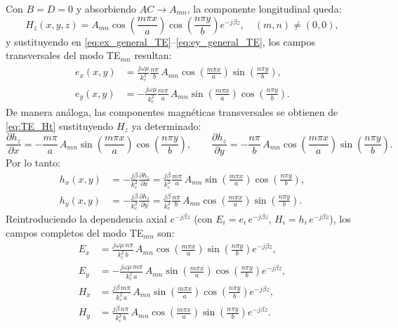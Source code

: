 \documentclass[
  11pt,
  letterpaper,
   addpoints,
   answers
  ]{exam}
\begin{document}
\begin{questions}
\begin{parts}
\begin{subparts}
\begin{solution}
\vspace{4pt}
Con $B=D=0$ y absorbiendo $AC\to A_{mn}$, la componente longitudinal queda:
\begin{equation}
H_z(x,y,z)=A_{mn}\cos\!\left(\frac{m\pi x}{a}\right)\cos\!\left(\frac{n\pi y}{b}\right)e^{-j\beta z},\quad (m,n)\neq(0,0),
\label{eq:Hz_TE_mn}
\end{equation}
y sustituyendo en \eqref{eq:ex_general_TE}--\eqref{eq:ey_general_TE}, los campos transversales del modo TE$_{mn}$ resultan:
\begin{align}
e_x(x,y) &= \frac{j\omega\mu}{k_c^2}\frac{n\pi}{b}\,A_{mn}
\cos\!\left(\frac{m\pi x}{a}\right)\sin\!\left(\frac{n\pi y}{b}\right),
\label{eq:ex_TE_mn}\\[6pt]
e_y(x,y) &= -\frac{j\omega\mu}{k_c^2}\frac{m\pi}{a}\,A_{mn}
\sin\!\left(\frac{m\pi x}{a}\right)\cos\!\left(\frac{n\pi y}{b}\right).
\label{eq:ey_TE_mn}
\end{align}
De manera análoga, las componentes magnéticas transversales se obtienen de \eqref{eq:TE_Ht} sustituyendo $H_z$ ya determinado:
\[
\frac{\partial h_z}{\partial x}=-\frac{m\pi}{a}\,A_{mn}\sin\!\left(\frac{m\pi x}{a}\right)\cos\!\left(\frac{n\pi y}{b}\right),
\qquad
\frac{\partial h_z}{\partial y}=-\frac{n\pi}{b}\,A_{mn}\cos\!\left(\frac{m\pi x}{a}\right)\sin\!\left(\frac{n\pi y}{b}\right).
\]
Por lo tanto:
\begin{align}
h_x(x,y) &= -\frac{j\beta}{k_c^2}\frac{\partial h_z}{\partial x}
= \frac{j\beta}{k_c^2}\frac{m\pi}{a}\,A_{mn}
\sin\!\left(\frac{m\pi x}{a}\right)\cos\!\left(\frac{n\pi y}{b}\right),
\label{eq:hx_TE_mn}\\[6pt]
h_y(x,y) &= -\frac{j\beta}{k_c^2}\frac{\partial h_z}{\partial y}
= \frac{j\beta}{k_c^2}\frac{n\pi}{b}\,A_{mn}
\cos\!\left(\frac{m\pi x}{a}\right)\sin\!\left(\frac{n\pi y}{b}\right).
\label{eq:hy_TE_mn}
\end{align}
Reintroduciendo la dependencia axial $e^{-j\beta z}$ (con $E_i=e_i\,e^{-j\beta z}$, $H_i=h_i\,e^{-j\beta z}$), los campos completos del modo TE$_{mn}$ son:
\begin{align}
E_x &= \frac{j\omega\mu\, n\pi}{k_c^2\, b}\,A_{mn}
\cos\!\left(\frac{m\pi x}{a}\right)\sin\!\left(\frac{n\pi y}{b}\right)e^{-j\beta z},
\label{eq:Ex_TE_mn}\\[6pt]
E_y &= -\frac{j\omega\mu\, m\pi}{k_c^2\, a}\,A_{mn}
\sin\!\left(\frac{m\pi x}{a}\right)\cos\!\left(\frac{n\pi y}{b}\right)e^{-j\beta z},
\label{eq:Ey_TE_mn}\\[6pt]
H_x &= \frac{j\beta\, m\pi}{k_c^2\, a}\,A_{mn}
\sin\!\left(\frac{m\pi x}{a}\right)\cos\!\left(\frac{n\pi y}{b}\right)e^{-j\beta z},
\label{eq:Hx_TE_mn}\\[6pt]
H_y &= \frac{j\beta\, n\pi}{k_c^2\, b}\,A_{mn}
\cos\!\left(\frac{m\pi x}{a}\right)\sin\!\left(\frac{n\pi y}{b}\right)e^{-j\beta z}.
\label{eq:Hy_TE_mn}
\end{align}


\end{solution}
\end{subparts}
\end{parts}
\end{questions}
\end{document}
